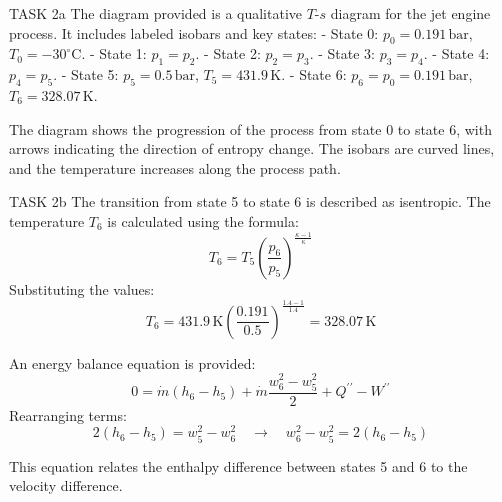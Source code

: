 TASK 2a  
The diagram provided is a qualitative \( T \)-\( s \) diagram for the jet engine process. It includes labeled isobars and key states:  
- State 0: \( p_0 = 0.191 \, \text{bar} \), \( T_0 = -30^\circ\text{C} \).  
- State 1: \( p_1 = p_2 \).  
- State 2: \( p_2 = p_3 \).  
- State 3: \( p_3 = p_4 \).  
- State 4: \( p_4 = p_5 \).  
- State 5: \( p_5 = 0.5 \, \text{bar} \), \( T_5 = 431.9 \, \text{K} \).  
- State 6: \( p_6 = p_0 = 0.191 \, \text{bar} \), \( T_6 = 328.07 \, \text{K} \).  

The diagram shows the progression of the process from state 0 to state 6, with arrows indicating the direction of entropy change. The isobars are curved lines, and the temperature increases along the process path.  

TASK 2b  
The transition from state 5 to state 6 is described as isentropic. The temperature \( T_6 \) is calculated using the formula:  
\[
T_6 = T_5 \left( \frac{p_6}{p_5} \right)^{\frac{\kappa - 1}{\kappa}}
\]  
Substituting the values:  
\[
T_6 = 431.9 \, \text{K} \left( \frac{0.191}{0.5} \right)^{\frac{1.4 - 1}{1.4}} = 328.07 \, \text{K}
\]  

An energy balance equation is provided:  
\[
0 = \dot{m} (h_6 - h_5) + \dot{m} \frac{w_6^2 - w_5^2}{2} + Q^{\prime\prime} - W^{\prime\prime}
\]  
Rearranging terms:  
\[
2 (h_6 - h_5) = w_5^2 - w_6^2 \quad \rightarrow \quad w_6^2 - w_5^2 = 2 (h_6 - h_5)
\]  

This equation relates the enthalpy difference between states 5 and 6 to the velocity difference.